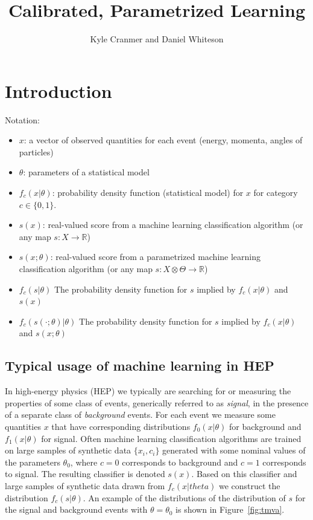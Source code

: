 \documentclass[11pt, oneside]{article}   	%
\title{Calibrated, Parametrized Learning}
\author{Kyle Cranmer and Daniel Whiteson}
\begin{document}
\maketitle

\section{Introduction}


Notation:

\begin{itemize}
 \item $x$: a vector of observed quantities for each event (energy, momenta, angles of particles)
 \item $\theta$: parameters of a statistical model
\item $f_c(x| \theta)$:  probability density function (statistical model) for $x$ for category $c\in\{0,1\}$.
\item $s(x)$: real-valued score from a machine learning classification algorithm (or any map $s: X\to\mathbb{R}$)
\item $s(x;\theta)$: real-valued score from a parametrized machine learning classification algorithm (or any map $s: X\otimes \Theta \to\mathbb{R}$)
\item $f_c( s | \theta )$ The probability density function for $s$ implied by $f_c(x|\theta)$ and $s(x)$
\item $f_c( s(\cdot; \theta) | \theta )$ The probability density function for $s$ implied by $f_c(x|\theta)$ and $s(x;\theta)$

\end{itemize}

\subsection{Typical usage of machine learning in HEP}

In high-energy physics (HEP) we typically are searching for or measuring the properties of some 
class of events, generically referred to as \textit{signal}, in the presence of a separate class 
of \textit{background} events. For each event we measure some quantities $x$ that have corresponding distributions 
$f_0(x|\theta)$ for background and $f_1(x|\theta)$ for signal.  Often machine learning classification algorithms are trained on large samples of synthetic data $\{x_i, c_i\}$ generated with some nominal values of the parameters $\theta_0$, where $c=0$ corresponds to background and $c=1$ corresponds to signal. The resulting classifier is denoted $s(x)$. Based on this classifier and large samples of synthetic data drawn from $f_c(x | theta)$ we construct the distribution  $f_c(s | \theta)$. An example of the distributions of the distribution of $s$ for the signal and background events with $\theta=\theta_0$ is shown in Figure~\ref{fig:tmva}.
\end{document}
